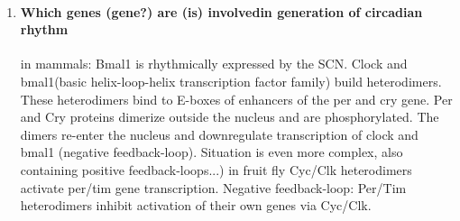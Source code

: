 \documentclass[12pt,article,oneside,a4paper]{memoir}
\begin{document}
\begin{enumerate}
\item \paragraph{Which genes (gene?) are (is) involvedin generation of
circadian rhythm}

in mammals: Bmal1 is rhythmically expressed by the SCN. Clock and bmal1(basic
helix-loop-helix transcription factor family) build heterodimers. These
heterodimers bind to E-boxes of enhancers of the per and cry gene. Per and Cry
proteins dimerize outside the nucleus and are phosphorylated. The dimers
re-enter the nucleus and downregulate transcription of  clock and bmal1
(negative feedback-loop). Situation is even more complex, also containing
positive feedback-loops...)
in fruit fly Cyc/Clk heterodimers activate per/tim gene transcription. Negative
feedback-loop: Per/Tim heterodimers inhibit activation of their own genes via
Cyc/Clk.
\end{enumerate}

\end{document}
